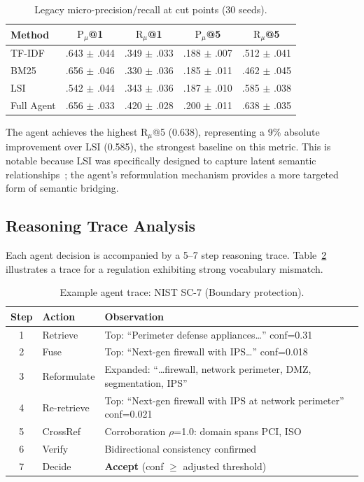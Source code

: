 \documentclass{sn-jnl}
\begin{document}
\begin{table}[t]
\caption{Legacy micro-precision/recall at cut points (30 seeds).}
\label{tab:legacy}
\centering
\small
\begin{tabular}{@{}lcccc@{}}
\toprule
Method & $\text{P}_\mu$@1 & $\text{R}_\mu$@1 & $\text{P}_\mu$@5 & $\text{R}_\mu$@5 \\
\midrule
TF-IDF        & .643 $\pm$ .044 & .349 $\pm$ .033 & .188 $\pm$ .007 & .512 $\pm$ .041 \\
BM25          & .656 $\pm$ .046 & .330 $\pm$ .036 & .185 $\pm$ .011 & .462 $\pm$ .045 \\
LSI           & .542 $\pm$ .044 & .343 $\pm$ .036 & .187 $\pm$ .010 & .585 $\pm$ .038 \\
\midrule
Full Agent    & .656 $\pm$ .033 & .420 $\pm$ .028 & .200 $\pm$ .011 & .638 $\pm$ .035 \\
\bottomrule
\end{tabular}
\end{table}

The agent achieves the highest $\text{R}_\mu$@5 (0.638), representing a 9\% absolute improvement over LSI (0.585), the strongest baseline on this metric.
This is notable because LSI was specifically designed to capture latent semantic relationships~\cite{MarcusMaletic2003}; the agent's reformulation mechanism provides a more targeted form of semantic bridging.


\subsection{Reasoning Trace Analysis}

Each agent decision is accompanied by a 5--7 step reasoning trace.
Table~\ref{tab:trace} illustrates a trace for a regulation exhibiting strong vocabulary mismatch.

\begin{table}[t]
\caption{Example agent trace: NIST SC-7 (Boundary protection).}
\label{tab:trace}
\centering
\small
\begin{tabular}{@{}clp{6.5cm}@{}}
\toprule
Step & Action & Observation \\
\midrule
1 & Retrieve & Top: ``Perimeter defense appliances\ldots'' conf=0.31 \\
2 & Fuse & Top: ``Next-gen firewall with IPS\ldots'' conf=0.018 \\
3 & Reformulate & Expanded: ``\ldots firewall, network perimeter, DMZ, segmentation, IPS'' \\
4 & Re-retrieve & Top: ``Next-gen firewall with IPS at network perimeter'' conf=0.021 \\
5 & CrossRef & Corroboration $\rho$=1.0: domain spans PCI, ISO \\
6 & Verify & Bidirectional consistency confirmed \\
7 & Decide & \textbf{Accept} (conf $\geq$ adjusted threshold) \\
\bottomrule
\end{tabular}
\end{table}
\end{document}
